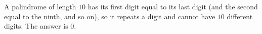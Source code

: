 A palindrome of length $10$ has its first digit equal to its last digit (and the second equal to the ninth, and so on), so it repeats a digit and cannot have $10$ different digits. The answer is $\boxed{0}$.
